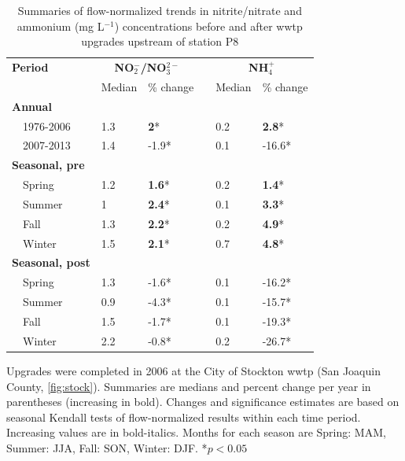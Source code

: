 \documentclass[letterpaper,12pt,oneside]{article}\usepackage[]{graphicx}\usepackage[]{color}
\begin{document}
\begin{table}[!tbp]
\caption{Summaries of flow-normalized trends in nitrite/nitrate and ammonium (mg L$^{-1}$) concentrations before and after \ac{wwtp} upgrades upstream of station P8\label{tab:p8chg}} 
\begin{center}
\begin{tabular}{lllcll}
\hline\hline
\multicolumn{1}{l}{\bfseries Period}&\multicolumn{2}{c}{\bfseries NO$_{2}^{-}$/NO$_{3}^{2-}$}&\multicolumn{1}{c}{\bfseries }&\multicolumn{2}{c}{\bfseries NH$_{4}^{+}$}\tabularnewline
\cline{2-3} \cline{5-6}
\multicolumn{1}{l}{}&\multicolumn{1}{c}{Median}&\multicolumn{1}{c}{\% change}&\multicolumn{1}{c}{}&\multicolumn{1}{c}{Median}&\multicolumn{1}{c}{\% change}\tabularnewline
\hline
{\bfseries Annual}&&&&&\tabularnewline
~~1976-2006&1.3&\textbf{2}*&&0.2&\textbf{2.8}*\tabularnewline
~~2007-2013&1.4&-1.9*&&0.1&-16.6*\tabularnewline
\hline
{\bfseries Seasonal, pre}&&&&&\tabularnewline
~~Spring&1.2&\textbf{1.6}*&&0.2&\textbf{1.4}*\tabularnewline
~~Summer&1&\textbf{2.4}*&&0.1&\textbf{3.3}*\tabularnewline
~~Fall&1.3&\textbf{2.2}*&&0.2&\textbf{4.9}*\tabularnewline
~~Winter&1.5&\textbf{2.1}*&&0.7&\textbf{4.8}*\tabularnewline
\hline
{\bfseries Seasonal, post}&&&&&\tabularnewline
~~Spring&1.3&-1.6*&&0.1&-16.2*\tabularnewline
~~Summer&0.9&-4.3*&&0.1&-15.7*\tabularnewline
~~Fall&1.5&-1.7*&&0.1&-19.3*\tabularnewline
~~Winter&2.2&-0.8*&&0.2&-26.7*\tabularnewline
\hline
\end{tabular}\end{center}
\footnotesize Upgrades were completed in 2006 at the City of Stockton \ac{wwtp} (San Joaquin County, \cref{fig:stock}). Summaries are  medians and percent change per year in parentheses (increasing in bold).  Changes and significance estimates are based on seasonal Kendall tests of flow-normalized results within each time period. Increasing values are in bold-italics. Months for each season are Spring: MAM, Summer: JJA, Fall: SON, Winter: DJF. *$p<0.05$\end{table}


\clearpage
\end{document}
